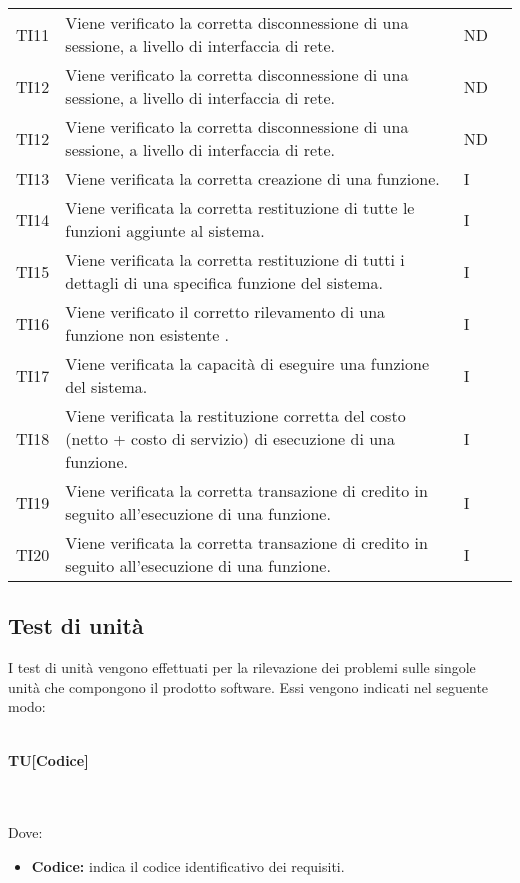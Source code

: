\begin{longtable}{|C{1.5cm}|C{8cm}|C{3cm}|C{1cm}|}
	TI11 &
	Viene verificato la corretta disconnessione di una sessione, a livello di interfaccia di rete.  &
	ND \\

	TI12 &
	Viene verificato la corretta disconnessione di una sessione, a livello di interfaccia di rete.  &
	ND \\

	TI12 &
	Viene verificato la corretta disconnessione di una sessione, a livello di interfaccia di rete.  &
	ND \\

	TI13 &
	Viene verificata la corretta creazione di una funzione.  &
	I \\

	TI14 &
	Viene verificata la corretta restituzione di tutte le funzioni aggiunte al sistema.  &
	I \\

	TI15 &
	Viene verificata la corretta restituzione di tutti i dettagli di una specifica funzione del sistema.  &
	I \\

	TI16 &
	Viene verificato il corretto rilevamento di una funzione non esistente .  &
	I \\

	TI17 &
	Viene verificata la capacità di eseguire una funzione del sistema.  &
	I \\

	TI18 &
	Viene verificata la restituzione corretta del costo (netto + costo di servizio) di esecuzione di una funzione.  &
	I \\

	TI19 &
	Viene verificata la corretta transazione di credito in seguito all'esecuzione di una funzione.  &
	I \\

	TI20 &
	Viene verificata la corretta transazione di credito in seguito all'esecuzione di una funzione.  &
	I \\
\end{longtable}

\newpage
\subsection{Test di unità}
I test di unità vengono effettuati per la rilevazione dei problemi sulle singole unità che compongono il prodotto software. Essi vengono indicati nel seguente modo:\\\\
\centerline{\textbf{TU[Codice]}}\\\\
Dove:
\begin{itemize}
	\item \textbf{Codice:} indica il codice identificativo dei requisiti.
\end{itemize}


